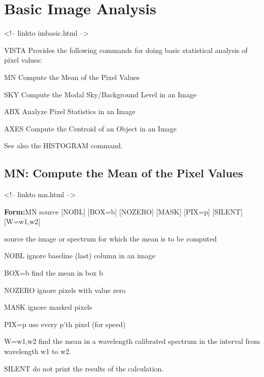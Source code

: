 \chapter{Basic Image Analysis}
\begin{rawhtml}
<!-- linkto imbasic.html -->
\end{rawhtml}

%
%
%

VISTA Provides the following commands for doing basic statistical
analysis of pixel values:
\begin{example}
  \item[MN\hfill]{Compute the Mean of the Pixel Values}
  \item[SKY\hfill]{Compute the Modal Sky/Background Level in an Image}
  \item[ABX\hfill]{Analyze Pixel Statistics in an Image}
  \item[AXES\hfill]{Compute the Centroid of an Object in an Image}
\end{example}
See also the HISTOGRAM command.

\section{MN: Compute the Mean of the Pixel Values}
\begin{rawhtml}
<!-- linkto mn.html -->
\end{rawhtml}
\begin{command}
  \item[\textbf{Form:}MN source {[NOBL]} {[BOX=b]} {[NOZERO]} {[MASK]}
       {[PIX=p]} {[SILENT]} {[W=w1,w2]}\hfill]{}
  \item[source]{the image or spectrum for which the mean
       is to be computed}
  \item[NOBL]{ignore baseline (last) column in an image}
  \item[BOX=b]{find the mean in box b}
  \item[NOZERO]{ignore pixels with value zero}
  \item[MASK]{ignore masked pixels}
  \item[PIX=p]{use every p'th pixel (for speed)}
  \item[W=w1,w2]{find the mean in a wavelength calibrated
       spectrum in the interval from wavelength w1 to w2.}
  \item[SILENT]{do not print the results of the calculation.}
\end{command}

